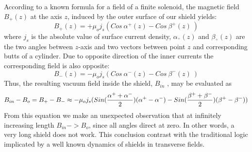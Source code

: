 \documentclass[12pt]{article}
\begin{document}
According  to a  known formula for a field  of a  finite  solenoid, the magnetic field   $B_+(z)$ 
at the axis $z$, induced by the outer surface of our shield  yields:
%
\begin{equation}
 B_{+}(z)=+\mu_o j_s(Cos~\alpha^+(z)-Cos~\beta^+(z)~)
\label{eq31}
\end{equation}
%
where 
$j_s$ is the absolute value of surface current density,
$\alpha_^+(z)$ and $\beta_^+(z)$ are  the two  angles between 
$z$-axis and two  vectors between   point $z$ and corresponding 
butts of a cylinder.
Due to  opposite direction of  the inner currents the corresponding field is also 
opposite:
%
\begin{equation}
B_-(z)=-\mu_o j_s(Cos~\alpha^-(z) - Cos~\beta^-(z)~)
\label{eq32}
\end{equation}
%
Thus, the resulting vacuum field inside the shield, $B_{in}$ , may be evaluated as
%
\begin{equation}
B_{in}-B_o = B_+ - B_-
\approx - \mu_o j_s
\small{(Sin(\frac{\alpha^++\alpha^-}{2})(\alpha^+-\alpha^-)
-Sin(\frac{\beta^++\beta^-}{2})(\beta^+-\beta^-))}
\label{eq1}
\end{equation}
%
From this equation we make an unexpected  observation
that at infinitely increasing length  $B_{in}->B_o$, 
since all angles direct at zero.
In other words, a very long shield  does  not work. 
This conclusion contrast with   the traditional logic implicated by a well known 
dynamics of shields in  transverse fields. 
\end{document}
